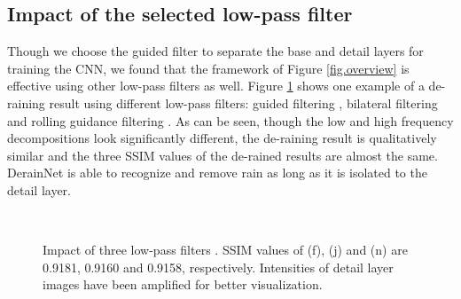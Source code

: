 \documentclass[journal]{IEEEtran}
\begin{document}
\subsection{Impact of the selected low-pass filter}
Though we choose the guided filter  \cite{23} to separate the base and detail layers for training the CNN, we found that the framework of Figure \ref{fig.overview} is effective using other low-pass filters as well. Figure \ref{fig.filters} shows one example of a de-raining result using different low-pass filters: guided filtering \cite{23}, bilateral filtering \cite{24} and rolling guidance filtering \cite{25}. As can be seen, though the low and high frequency decompositions look significantly different, the de-raining result is qualitatively similar and the three SSIM values of the de-rained results are almost the same. DerainNet is able to recognize and remove rain as long as it is isolated to the detail layer.

\begin{figure}
\centering
{}
\\
\caption{Impact of three low-pass filters \cite{23,24,25}. SSIM values of (f), (j) and (n) are 0.9181, 0.9160 and 0.9158, respectively. Intensities of detail layer images have been amplified for better visualization.} \label{fig.filters}
\end{figure}
\end{document}
